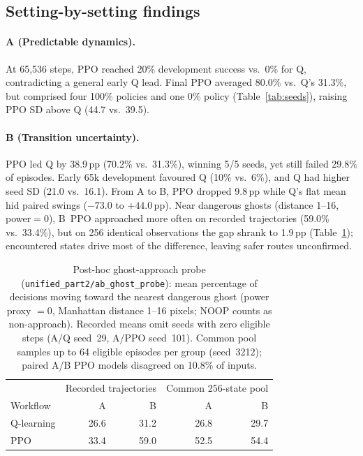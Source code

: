 \subsection{Setting-by-setting findings}
\paragraph{A (Predictable dynamics).}
At 65,536 steps, PPO reached 20\% development success vs.\ 0\% for Q, contradicting a general
early Q lead. Final PPO averaged 80.0\% vs.\ Q's 31.3\%, but comprised four 100\% policies
and one 0\% policy (Table~\ref{tab:seeds}), raising PPO SD above Q (44.7 vs.\ 39.5).

\paragraph{B (Transition uncertainty).}
PPO led Q by 38.9\,pp (70.2\% vs.\ 31.3\%), winning 5/5 seeds, yet still failed 29.8\% of
episodes. Early 65k development favoured Q (10\% vs.\ 6\%), and Q had higher seed SD (21.0 vs.\ 16.1).
From A to B, PPO dropped 9.8\,pp while Q's flat mean hid paired swings ($-73.0$ to $+44.0$\,pp).
Near dangerous ghosts (distance 1--16, power$=0$), B~PPO approached more often on recorded
trajectories (59.0\% vs.\ 33.4\%), but on 256 identical observations the gap shrank to 1.9\,pp
(Table~\ref{tab:matched-actions}); encountered states drive most of the difference, leaving safer routes unconfirmed.

\begin{table}[H]\centering\small
\begin{tabular}{@{}lrrrr@{}}\toprule
& \multicolumn{2}{c}{Recorded trajectories} & \multicolumn{2}{c}{Common 256-state pool}\\
Workflow & A & B & A & B\\\midrule
Q-learning & 26.6 & 31.2 & 26.8 & 29.7\\
PPO & 33.4 & 59.0 & 52.5 & 54.4\\\bottomrule
\end{tabular}
\caption{Post-hoc ghost-approach probe (\texttt{unified\_part2/ab\_ghost\_probe}): mean percentage of decisions moving toward the nearest dangerous ghost (power proxy $=0$, Manhattan distance 1--16 pixels; NOOP counts as non-approach). Recorded means omit seeds with zero eligible steps (A/Q seed~29, A/PPO seed~101). Common pool samples up to 64 eligible episodes per group (seed~3212); paired A/B PPO models disagreed on 10.8\% of inputs.}
\label{tab:matched-actions}
\end{table}

